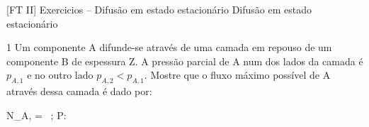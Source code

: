 \documentclass[\mainfilename]{subfiles}
\begin{document}

[FT II]
{Exercicios -- Difusão em estado estacionário} %
{Difusão em estado estacionário} %

\begin{questionBox}1{ %
    Um componente A difunde-se através de uma camada em repouso de um componente B de espessura Z. A pressão parcial de A num dos lados da camada é \(p_{A,1}\) e no outro lado \(p_{A,2} < p_{A,1}\).
} %
    Mostre que o fluxo máximo possível de A através dessa camada é dado por:
    \begin{BM}
        N_{A,\max}
        = 
        \,\ln{}
        ;\qquad
        P:
    \end{BM}


\end{questionBox}
\end{document}
